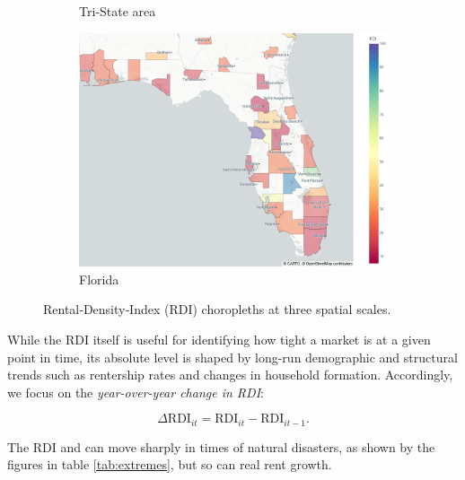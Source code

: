 \documentclass[APA,Times1COL]{WileyNJDv5} %
\begin{document}
\begin{figure}[hbt!]
\begin{subfigure}[b]{0.32\textwidth}
		\caption{Tri‑State area}\label{fig:tristate_choropleth}
	\end{subfigure}\hfill
	\begin{subfigure}[b]{0.32\textwidth}
		\includegraphics[width=\linewidth]{florida.png}
		\caption{Florida}\label{fig:florida_choropleth}
	\end{subfigure}
	
	\caption{Rental‑Density‑Index (RDI) choropleths at three spatial scales.}
	\label{fig:choropleth_panel}
\end{figure}


While the RDI itself is useful for identifying how tight a market is at a given point in time, its absolute level is shaped by long-run demographic and structural trends such as rentership rates and changes in household formation. Accordingly, we focus on the \textit{year-over-year change in RDI}:

\begin{equation*}
	\Delta \text{RDI}_{it} = \text{RDI}_{it} - \text{RDI}_{it-1}.
\end{equation*}

The RDI and can move sharply in times of natural disasters, as shown by the figures in table \ref{tab:extremes}, but so can real rent growth.  
\end{document}

